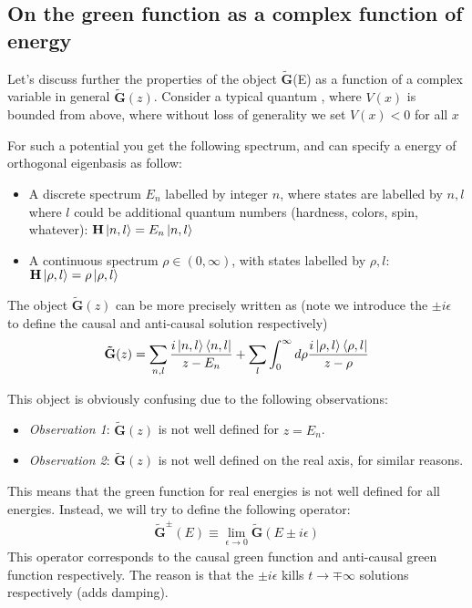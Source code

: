 \documentclass[11pt]{article}
\theoremstyle{definition}
\begin{document}
\subsection{On the green function as a complex function of energy}
\newcommand{\tG}{\mathbf{\tilde{G}}}
Let's discuss further the properties of the object $\tG$(E) as a function of a complex variable in general $\tG(z)$.  Consider a typical quantum , where $V(x)$ is bounded from above, where without loss of generality we set $V(x) < 0$ for all $x$

For such a potential you get the following spectrum, and can specify a energy of orthogonal eigenbasis as follow:
\begin{itemize}
\item A discrete spectrum $E_n$ labelled by integer $n$, where states are labelled by $n, l$  where $l$ could be additional quantum numbers (hardness, colors, spin, whatever): $ \mathbf{H} \ket{n, l} = E_n \ket{n, l}$ 
\item A continuous spectrum $\rho \in (0, \infty)$, with states labelled by $\rho, l$:  $\mathbf{H} \ket{\rho, l} = \rho \ket{\rho, l}$
\end{itemize}

The object $\tG (z)$ can be more precisely written as (note we introduce the $\pm i \epsilon$ to define the causal and anti-causal solution respectively)
\begin{align}
\tG(z) = \sum_{n, l} {i \ket{n, l} \bra{n, l} \over z - E_n} + \sum_l \int_{0}^\infty d\rho {i \ket{\rho, l} \bra{\rho, l} \over z - \rho}
\end{align}

This object is obviously confusing due to the following observations:
\begin{itemize}
\item \emph{Observation 1}: $\tG(z)$ is not well defined for $z = E_n$.  
\item \emph{Observation 2}: $\tG(z)$ is not well defined on the real axis, for similar reasons.
\end{itemize}

This means that the green function for real energies is not well defined for all energies.  Instead, we will try to define the following operator:
\begin{align}
\tG^\pm(E) \equiv \lim_{\epsilon \rightarrow 0} \tG(E \pm i \epsilon)
\end{align}
This operator corresponds to the causal green function and anti-causal green function respectively.  The reason is that the $\pm i \epsilon$ kills $ t \rightarrow \mp \infty$ solutions respectively (adds damping).
 
\end{document}
